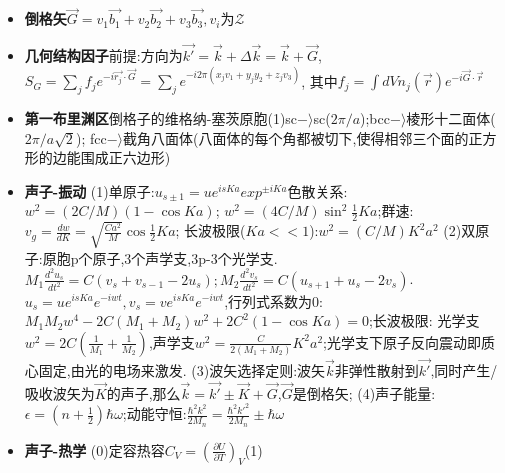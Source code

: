 \documentclass[UTF8,a4paper,1pt]{ctexart}
\begin{document}
\begin{itemize}
  \item \textbf{倒格矢}$\vec{G}=v_1\vec{b_1}+v_2\vec{b_2}+v_3\vec{b_3},v_{i}为\mathcal{Z}$
  \item \textbf{几何结构因子}前提:方向为$\vec{k'}=\vec{k}+\Delta\vec{k}=\vec{k}+\vec{G}$,
  $S_{G}=\sum_{j} f_{j}e^{-i\vec{r_{j}}\cdot\vec{G}}=\sum_{j}e^{-i2\pi(x_j v_1+y_j y_2+z_j v_3)}$,
  其中$f_{j}=\int dVn_{j}(\vec{r})e^{-i\vec{G}\cdot\vec{r}}$
  \item \textbf{第一布里渊区}倒格子的维格纳-塞茨原胞(1)sc$-\rangle$sc($2\pi/a$);bcc$-\rangle$棱形十二面体($2\pi/a\sqrt{2}$);
  fcc$-\rangle$截角八面体(八面体的每个角都被切下,使得相邻三个面的正方形的边能围成正六边形)

  \item \textbf{声子-振动}
  (1)单原子:$u_{s\pm 1}=ue^{isKa}exp^{\pm iKa}$色散关系:$w^2=(2C/M)(1-\cos{Ka})$;
  $w^2=(4C/M)\sin^2{\frac{1}{2}Ka}$;群速:$v_{g}=\frac{dw}{dK}=\sqrt{\frac{Ca^2}{M}}\cos{\frac{1}{2}Ka}$;
  长波极限($Ka<<1$):$w^2=(C/M)K^{2}a^{2}$
  (2)双原子:原胞p个原子,3个声学支,3p-3个光学支.$M_1\frac{d^2 u_s}{dt^2}=C(v_s+v_{s-1}-2u_s);M_2\frac{d^2 v_s}{dt^2}=C(u_{s+1}+u_{s}-2v_s)$.
  $u_s=ue^{isKa}e^{-iwt},v_s=ve^{isKa}e^{-iwt}$,行列式系数为0:$M_1 M_2 w^4-2C(M_1+M_2)w^2+2C^2(1-\cos{Ka})=0$;长波极限:
  光学支$w^2=2C(\frac{1}{M_1}+\frac{1}{M_2})$,声学支$w^2=\frac{C}{2(M_1+M_2)}K^2 a^2$;光学支下原子反向震动即质心固定,由光的电场来激发.
  (3)波矢选择定则:波矢$\vec{k}$非弹性散射到$\vec{k'}$,同时产生/吸收波矢为$\vec{K}$的声子,那么$\vec{k}=\vec{k'}\pm\vec{K}+\vec{G}$,$\vec{G}$是倒格矢;
  (4)声子能量:$\epsilon=(n+\frac{1}{2})\hbar\omega$;动能守恒:$\frac{\hbar^2 k^2}{2M_n}=\frac{\hbar^2 k'^2}{2M_n}\pm\hbar\omega$

  \item \textbf{声子-热学}
  (0)定容热容$C_V=(\frac{\partial U}{\partial T})_V$(1)
\end{itemize}

\end{document}
